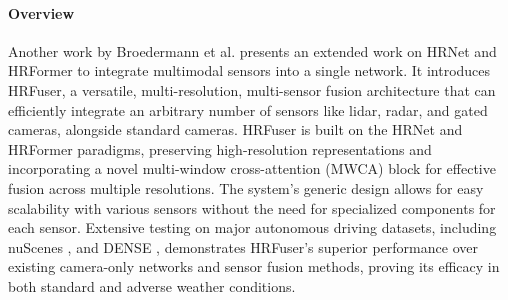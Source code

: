 \documentclass[report.tex]{subfiles}
\begin{document}
    
    \paragraph*{Overview}

    Another work by Broedermann et al. \cite{broedermann2022hrfuser} presents an extended work on HRNet \cite{wang2020hrnet} and HRFormer \cite{yuan2021hrformer} to integrate multimodal sensors into a single network. It introduces HRFuser, a versatile, multi-resolution, multi-sensor fusion architecture that can efficiently integrate an arbitrary number of sensors like lidar, radar, and gated cameras, alongside standard cameras. HRFuser is built on the HRNet and HRFormer paradigms, preserving high-resolution representations and incorporating a novel multi-window cross-attention (MWCA) block for effective fusion across multiple resolutions. The system's generic design allows for easy scalability with various sensors without the need for specialized components for each sensor. Extensive testing on major autonomous driving datasets, including nuScenes \cite{caesar2020nuscenes}, and DENSE \cite{bijelic2020seeing}, demonstrates HRFuser's superior performance over existing camera-only networks and sensor fusion methods, proving its efficacy in both standard and adverse weather conditions.
\end{document}
